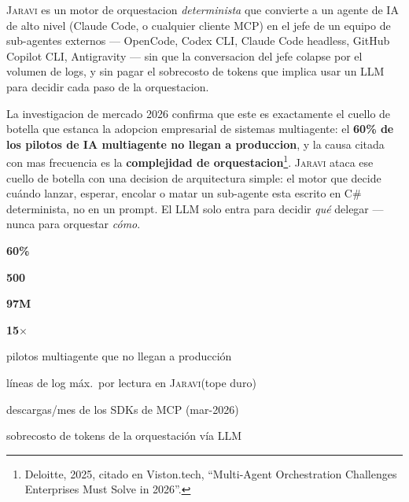 \documentclass[11pt]{article}
\newcommand{\stat}[3][jaraviaccent]{%
  \begin{minipage}[t]{#2}
    \centering
    {\sffamily\bfseries\fontsize{22}{24}\selectfont\color{#1}#3}\\[2pt]
  \end{minipage}%
}
\newcommand{\jaravi}{\textsc{Jaravi}\xspace}
\begin{document}
\jaravi es un motor de orquestacion \emph{determinista} que convierte a un agente de IA de alto nivel (Claude Code, o cualquier cliente MCP) en el jefe de un equipo de sub-agentes externos --- OpenCode, Codex CLI, Claude Code headless, GitHub Copilot CLI, Antigravity --- sin que la conversacion del jefe colapse por el volumen de logs, y sin pagar el sobrecosto de tokens que implica usar un LLM para decidir cada paso de la orquestacion.

La investigacion de mercado 2026 confirma que este es exactamente el cuello de botella que estanca la adopcion empresarial de sistemas multiagente: el \textbf{60\% de los pilotos de IA multiagente no llegan a produccion}, y la causa citada con mas frecuencia es la \textbf{complejidad de orquestacion}\footnote{Deloitte, 2025, citado en Viston.tech, ``Multi-Agent Orchestration Challenges Enterprises Must Solve in 2026''.}. \jaravi ataca ese cuello de botella con una decision de arquitectura simple: el motor que decide cuándo lanzar, esperar, encolar o matar un sub-agente esta escrito en C\# determinista, no en un prompt. El LLM solo entra para decidir \emph{qué} delegar --- nunca para orquestar \emph{cómo}.

\begin{center}
\stat{0.24\textwidth}{60\%}\hfill
\stat[jaravigreen]{0.24\textwidth}{500}\hfill
\stat[jaraviamber]{0.24\textwidth}{97M}\hfill
\stat[jaravired]{0.24\textwidth}{15$\times$}
\end{center}
\vspace{-8pt}
\begin{center}
\footnotesize\sffamily\color{jaravimuted}
\begin{minipage}{0.24\textwidth}\centering pilotos multiagente que no llegan a producción\end{minipage}\hfill
\begin{minipage}{0.24\textwidth}\centering líneas de log máx.\ por lectura en \jaravi (tope duro)\end{minipage}\hfill
\begin{minipage}{0.24\textwidth}\centering descargas/mes de los SDKs de MCP (mar-2026)\end{minipage}\hfill
\begin{minipage}{0.24\textwidth}\centering sobrecosto de tokens de la orquestación vía LLM\footnotemark\end{minipage}
\end{center}
\end{document}
